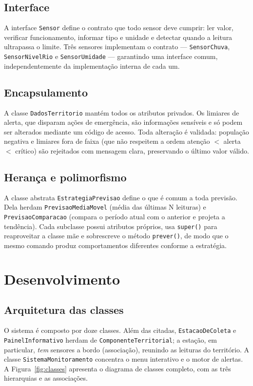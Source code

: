 \documentclass[12pt,a4paper]{article}
\begin{document}
\subsection{Interface}
A interface \texttt{Sensor} define o contrato que todo sensor deve cumprir: ler valor, verificar funcionamento, informar tipo e unidade e detectar quando a leitura ultrapassa o limite. Três sensores implementam o contrato — \texttt{SensorChuva}, \texttt{SensorNivelRio} e \texttt{SensorUmidade} — garantindo uma interface comum, independentemente da implementação interna de cada um.

\subsection{Encapsulamento}
A classe \texttt{DadosTerritorio} mantém todos os atributos privados. Os limiares de alerta, que disparam ações de emergência, são informações sensíveis e só podem ser alterados mediante um código de acesso. Toda alteração é validada: população negativa e limiares fora de faixa (que não respeitem a ordem atenção $<$ alerta $<$ crítico) são rejeitados com mensagem clara, preservando o último valor válido.

\subsection{Herança e polimorfismo}
A classe abstrata \texttt{EstrategiaPrevisao} define o que é comum a toda previsão. Dela herdam \texttt{PrevisaoMediaMovel} (média das últimas N leituras) e \texttt{PrevisaoComparacao} (compara o período atual com o anterior e projeta a tendência). Cada subclasse possui atributos próprios, usa \texttt{super()} para reaproveitar a classe mãe e sobrescreve o método \texttt{prever()}, de modo que o mesmo comando produz comportamentos diferentes conforme a estratégia.

\section{Desenvolvimento}

\subsection{Arquitetura das classes}
O sistema é composto por doze classes. Além das citadas, \texttt{EstacaoDeColeta} e \texttt{PainelInformativo} herdam de \texttt{ComponenteTerritorial}; a estação, em particular, \textit{tem} sensores a bordo (associação), reunindo as leituras do território. A classe \texttt{SistemaMonitoramento} concentra o menu interativo e o motor de alertas. A Figura~\ref{fig:classes} apresenta o diagrama de classes completo, com as três hierarquias e as associações.
\end{document}
